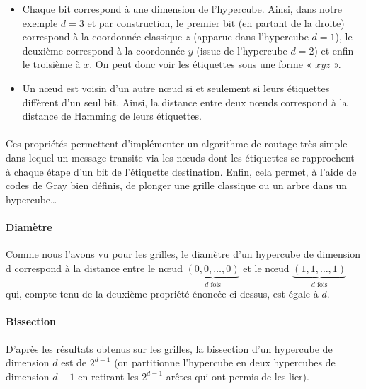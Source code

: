 \begin{itemize}
\item Chaque bit correspond à une dimension de l'hypercube. Ainsi, dans notre exemple $d=3$ et par construction, le premier bit (en partant de la droite) correspond à la coordonnée classique $z$ (apparue dans l'hypercube $d=1$), le deuxième correspond à la coordonnée $y$ (issue de l'hypercube $d=2$) et enfin le troisième à $x$. On peut donc voir les étiquettes sous une forme « $xyz$ ».
\item Un nœud est voisin d'un autre nœud si et seulement si leurs étiquettes diffèrent d'un seul bit. Ainsi, la distance entre deux nœuds correspond à la distance de Hamming de leurs étiquettes.
\end{itemize}

\paragraph{}
Ces propriétés permettent d'implémenter un algorithme de routage très simple dans lequel un message transite via les nœuds dont les étiquettes se rapprochent à chaque étape d'un bit de l'étiquette destination. Enfin, cela permet, à l'aide de codes de Gray bien définis, de plonger une grille classique ou un arbre dans un hypercube…

\paragraph{Diamètre} Comme nous l'avons vu pour les grilles, le diamètre d'un hypercube de dimension d correspond à la distance entre le nœud $\underbrace{(0,0,…,0)}_{d \text{ fois}}$ et le nœud $\underbrace{(1,1,…,1)}_{d \text{ fois}}$ qui, compte tenu de la deuxième propriété énoncée ci-dessus, est égale à $d$.

\paragraph{Bissection} D'après les résultats obtenus sur les grilles, la bissection d'un hypercube de dimension $d$ est de $2^{d-1}$ (on partitionne l'hypercube en deux hypercubes de dimension $d-1$ en retirant les $2^{d-1}$ arêtes qui ont permis de les lier).


